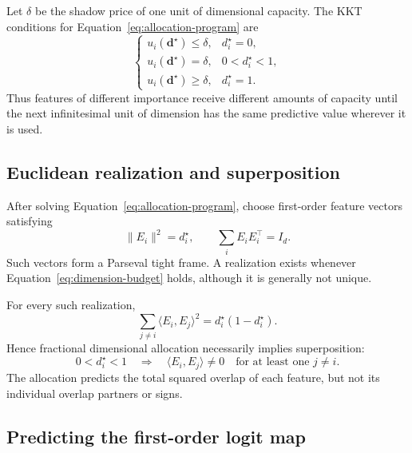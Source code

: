 Let \(\delta\) be the shadow price of one unit of dimensional capacity. The KKT
conditions for Equation~\eqref{eq:allocation-program} are
\begin{equation}
\boxed{
\begin{cases}
u_i(\mathbf d^\star)\le \delta,
&d_i^\star=0,
\\[1mm]
u_i(\mathbf d^\star)=\delta,
&0<d_i^\star<1,
\\[1mm]
u_i(\mathbf d^\star)\ge \delta,
&d_i^\star=1.
\end{cases}
}
\label{eq:water-filling}
\end{equation}
Thus features of different importance receive different amounts of capacity until
the next infinitesimal unit of dimension has the same predictive value wherever it
is used.

\subsection{Euclidean realization and superposition}

After solving Equation~\eqref{eq:allocation-program}, choose first-order feature
vectors satisfying
\begin{equation}
\boxed{
\|E_i\|^2=d_i^\star,
\qquad
\sum_iE_iE_i^\top=I_d.
}
\label{eq:tight-frame-realization}
\end{equation}
Such vectors form a Parseval tight frame. A realization exists whenever
Equation~\eqref{eq:dimension-budget} holds, although it is generally not unique.

For every such realization,
\begin{equation}
\boxed{
\sum_{j\neq i}
\langle E_i,E_j\rangle^2
=
d_i^\star(1-d_i^\star).
}
\label{eq:forced-overlap}
\end{equation}
Hence fractional dimensional allocation necessarily implies superposition:
\[
0<d_i^\star<1
\quad\Longrightarrow\quad
\langle E_i,E_j\rangle\neq0
\quad\text{for at least one }j\neq i.
\]
The allocation predicts the total squared overlap of each feature, but not its
individual overlap partners or signs.

\subsection{Predicting the first-order logit map}

